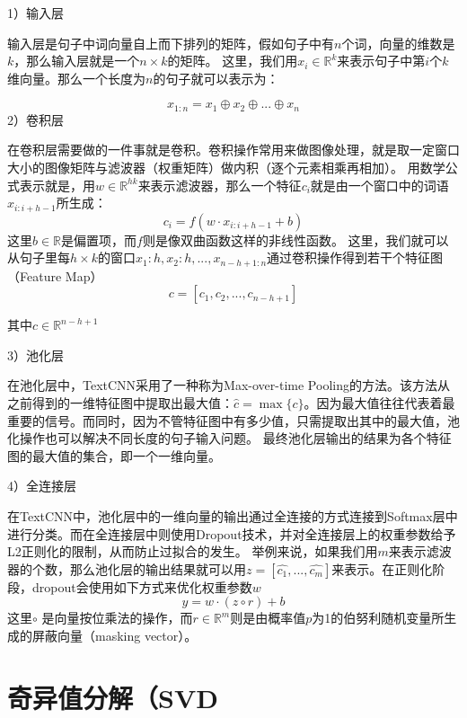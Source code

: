 1）输入层

输入层是句子中词向量自上而下排列的矩阵，假如句子中有$n$个词，向量的维数是$k$，那么输入层就是一个$n\times k$的矩阵。
这里，我们用$x_i \in  \mathbb{R}^k$来表示句子中第$i$个$k$维向量。那么一个长度为$n$的句子就可以表示为：

\begin{equation}
x_{1:n} = x_1 \oplus x_2 \oplus ...\oplus x_n
\end{equation}
2）卷积层

在卷积层需要做的一件事就是卷积。卷积操作常用来做图像处理，就是取一定窗口大小的图像矩阵与滤波器（权重矩阵）做内积（逐个元素相乘再相加）。
用数学公式表示就是，用$w \in \mathbb{R}^{hk}$来表示滤波器，那么一个特征$c_i$就是由一个窗口中的词语$x_{i:i+h-1}$所生成：
\begin{equation}
c_i = f(w\cdot x_{i:i+h-1} + b)
\end{equation}
这里$b\in \mathbb{R}$是偏置项，而$f$则是像双曲函数这样的非线性函数。
这里，我们就可以从句子里每$h \times k$的窗口${x_1:h,x_2:h,...,x_{n-h+1:n}}$通过卷积操作得到若干个特征图（Feature Map）
\begin{equation}
c = [c_1, c_2,...,c_{n-h+1}]
\end{equation}

其中$c \in \mathbb{R}^{n-h+1}$

3）池化层

在池化层中，TextCNN采用了一种称为Max-over-time Pooling的方法。该方法从之前得到的一维特征图中提取出最大值：$\hat{c} = \max\{c\}$。因为最大值往往代表着最重要的信号。而同时，因为不管特征图中有多少值，只需提取出其中的最大值，池化操作也可以解决不同长度的句子输入问题。
最终池化层输出的结果为各个特征图的最大值的集合，即一个一维向量。

4）全连接层

在TextCNN中，池化层中的一维向量的输出通过全连接的方式连接到Softmax层中进行分类。而在全连接层中则使用Dropout技术，并对全连接层上的权重参数给予L2正则化的限制，从而防止过拟合的发生。
举例来说，如果我们用$m$来表示滤波器的个数，那么池化层的输出结果就可以用$z = [\hat{c_1},...,\hat{c_m}]$来表示。在正则化阶段，dropout会使用如下方式来优化权重参数$w$
\begin{equation}
y = w\cdot(z \circ r) + b
\end{equation}
这里$\circ$ 是向量按位乘法的操作，而$r\in \mathbb{R}^m$则是由概率值$p$为1的伯努利随机变量所生成的屏蔽向量（masking vector）。

\section{奇异值分解（SVD}

